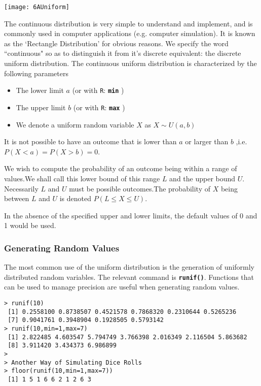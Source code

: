 \documentclass[a4paper,12pt]{article}
\begin{document}
\begin{center}
\texttt{[image: 6AUniform]}
\end{center}
The continuous distribution is very simple to understand and implement, and is commonly used in computer applications (e.g. computer simulation).
It is known as the `Rectangle Distribution' for obvious reasons. We specify the word ``continuous" so as to distinguish it from it's discrete equivalent: the discrete uniform distribution.
The continuous uniform distribution is characterized by the following parameters

\begin{itemize}
\item The lower limit $a$ (or with \texttt{R}: \texttt{\textbf{min}} )
\item The upper limit $b$ (or with \texttt{R}: \texttt{\textbf{max}} )
\item We denote a uniform random variable $X$ as $X \sim U(a,b)$
\end{itemize}

It is not possible to have an outcome that is lower than $a$ or larger than $b$ ,i.e. $ P(X < a) = P(X > b) = 0$.

We wish to compute the probability of an outcome being within a range of values.We shall call this lower bound of this range $L$ and the upper bound $ U$. Necessarily $L$ and $U$ must be possible outcomes.The probability of $X$ being between $L$ and $U$ is denoted $P( L \leq X \leq U )$.

In the absence of the specified upper and lower limits, the default values of 0 and 1 would be used.

\subsubsection{Generating Random Values}
The most common use of the uniform distribution is the generation of uniformly distributed random variables. The relevant command is \texttt{\textbf{runif()}}. Functions that can be used to manage precision are useful when generating random values.

\begin{verbatim}
> runif(10)
 [1] 0.2558100 0.8738507 0.4521578 0.7868320 0.2310644 0.5265236
 [7] 0.9041761 0.3948904 0.1928505 0.5793142
> runif(10,min=1,max=7)
 [1] 2.822485 4.603547 5.794749 3.766398 2.016349 2.116504 5.863682
 [8] 3.911420 3.434373 6.986899
>
> Another Way of Simulating Dice Rolls
> floor(runif(10,min=1,max=7))
 [1] 1 5 1 6 6 2 1 2 6 3
\end{verbatim}
\end{document}
